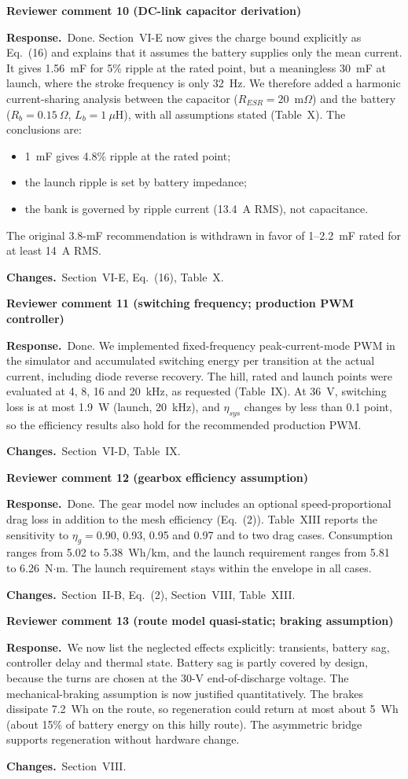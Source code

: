 \documentclass[10pt]{article}
\newcommand{\rev}[1]{\par\medskip\noindent\textbf{Reviewer comment #1}\par}
\newcommand{\resp}{\par\noindent\textcolor{blue!50!black}{\textbf{Response.}}~}
\newcommand{\chg}{\par\noindent\textcolor{green!35!black}{\textbf{Changes.}}~}
\begin{document}
\rev{10 (DC-link capacitor derivation)}
\resp Done. Section~VI-E now gives the charge bound explicitly as
Eq.~(16) and explains that it assumes the battery supplies only the mean
current. It gives 1.56~mF for 5\% ripple at the rated point, but a meaningless
30~mF at launch, where the stroke frequency is only 32~Hz. We therefore added
a harmonic current-sharing analysis between the capacitor
($R_{ESR}=20$~m$\Omega$) and the battery ($R_b=0.15~\Omega$, $L_b=1~\mu$H),
with all assumptions stated (Table~X). The conclusions are:
\begin{itemize}[nosep]
\item 1~mF gives 4.8\% ripple at the rated point;
\item the launch ripple is set by battery impedance;
\item the bank is governed by ripple current (13.4~A RMS), not capacitance.
\end{itemize}
The original 3.8-mF recommendation is withdrawn in favor of 1--2.2~mF rated
for at least 14~A RMS.
\chg Section~VI-E, Eq.~(16), Table~X.

\rev{11 (switching frequency; production PWM controller)}
\resp Done. We implemented fixed-frequency peak-current-mode PWM in the
simulator and accumulated switching energy per transition at the actual
current, including diode reverse recovery. The hill, rated and launch points
were evaluated at 4, 8, 16 and 20~kHz, as requested (Table~IX). At 36~V,
switching loss is at most 1.9~W (launch, 20~kHz), and $\eta_{sys}$ changes by
less than 0.1 point, so the efficiency results also hold for the recommended
production PWM.
\chg Section~VI-D, Table~IX.

\rev{12 (gearbox efficiency assumption)}
\resp Done. The gear model now includes an optional speed-proportional drag
loss in addition to the mesh efficiency (Eq.~(2)). Table~XIII reports the
sensitivity to $\eta_g=0.90$, 0.93, 0.95 and 0.97 and to two drag cases.
Consumption ranges from 5.02 to 5.38~Wh/km, and the launch requirement ranges
from 5.81 to 6.26~N$\cdot$m. The launch requirement stays within the envelope
in all cases.
\chg Section~II-B, Eq.~(2), Section~VIII, Table~XIII.

\rev{13 (route model quasi-static; braking assumption)}
\resp We now list the neglected effects explicitly: transients, battery sag,
controller delay and thermal state. Battery sag is partly covered by design,
because the turns are chosen at the 30-V end-of-discharge voltage. The
mechanical-braking assumption is now justified quantitatively. The brakes
dissipate 7.2~Wh on the route, so regeneration could return at most about
5~Wh (about 15\% of battery energy on this hilly route). The asymmetric bridge
supports regeneration without hardware change.
\chg Section~VIII.
\end{document}
